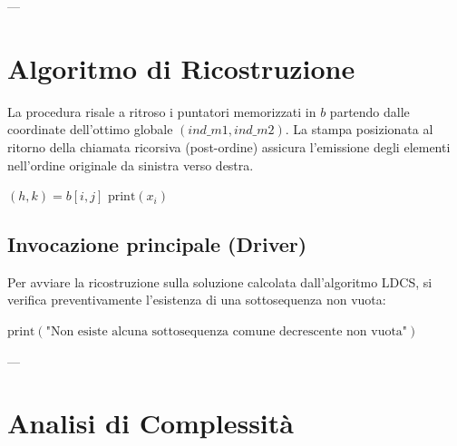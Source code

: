 ---

\section{Algoritmo di Ricostruzione}

La procedura risale a ritroso i puntatori memorizzati in $b$ partendo dalle coordinate dell'ottimo globale $(\mathit{ind\_m1}, \mathit{ind\_m2})$. La stampa posizionata al ritorno della chiamata ricorsiva (post-ordine) assicura l'emissione degli elementi nell'ordine originale da sinistra verso destra.

\begin{algorithm}[H]
\caption{Ricostruzione e stampa della LDCS ottima}
\label{alg:print-ldcs}
\begin{algorithmic}[1]
     
        \State \Return
    \EndIf
    \State $(h, k) = b[i, j]$ 
    \State {} 
    \State $\text{print}(x_i)$ 
\EndProcedure
\end{algorithmic}
\end{algorithm}

\subsection{Invocazione principale (Driver)}
Per avviare la ricostruzione sulla soluzione calcolata dall'algoritmo \textsc{LDCS}, si verifica preventivamente l'esistenza di una sottosequenza non vuota:
\begin{algorithmic}[1]
    \State $\text{print}(\text{"Non esiste alcuna sottosequenza comune decrescente non vuota"})$
\Else
    \State {}
\EndIf
\end{algorithmic}

---

\section{Analisi di Complessità}

